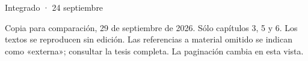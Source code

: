 \documentclass[spanish,a4paper,12pt]{article}
\begin{document}
\begin{center}\Large Integrado · 24 septiembre\end{center}
\noindent Copia para comparación, 29 de septiembre de 2026. Sólo capítulos 3, 5 y 6.
Los textos se reproducen sin edición. Las referencias a material omitido se indican
como «externa»; consultar la tesis completa. La paginación cambia en esta vista.
\tableofcontents

\clearpage
\setcounter{section}{2}
\label{review:03}


\clearpage
\setcounter{section}{4}
\label{review:05}


\clearpage
\setcounter{section}{5}
\label{review:06}


\clearpage
\printbibliography
\end{document}
